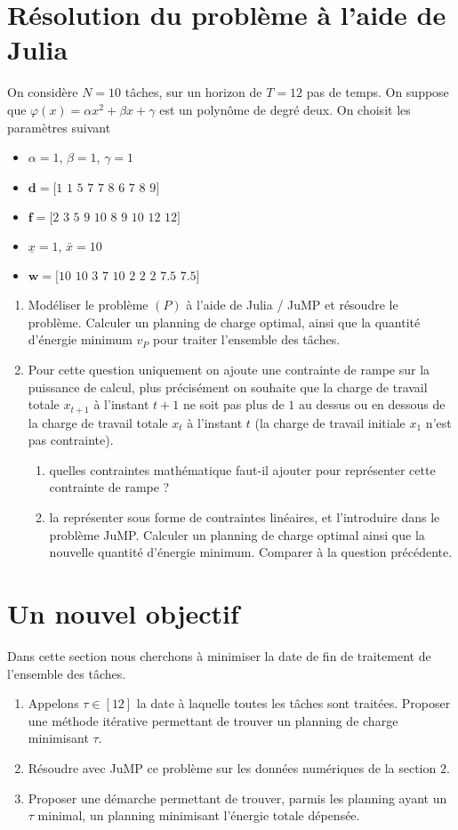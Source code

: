 \documentclass[10pt]{article}
\begin{document}
\section{Résolution du problème à l'aide de Julia}
On considère $N=10$ tâches, sur un horizon de $T=12$ pas de temps. On suppose que $\varphi(x) = \alpha x^2+ \beta x + \gamma $ est un polynôme de degré deux. On choisit les paramètres suivant
\begin{itemize}
	\item $\alpha = 1$, $\beta=1$, $\gamma = 1$
	\item $\mathbf{d}=\textrm{[1 1 5 7 7 8 6 7 8 9]}$
	\item $\mathbf{f}=\textrm{[2 3 5 9 10 8 9 10 12 12]}$
	\item $\underline{x}=1$, $\bar{x} = 10$
	\item $\mathbf{w}=\textrm{[10 10 3 7 10 2 2 2 7.5 7.5]}$
\end{itemize}
\begin{enumerate}[resume]
	\item Modéliser le problème $(P)$ à l'aide de Julia / JuMP et résoudre le problème.
	Calculer un planning de charge optimal, ainsi que la quantité d'énergie minimum $v_P$ pour traiter l'ensemble des tâches.
	\item Pour cette question uniquement on ajoute une contrainte de rampe sur la puissance de calcul, plus précisément on souhaite que la charge de travail totale $x_{t+1}$ à l'instant $t+1$ ne soit pas plus de $1$ au dessus ou en dessous de la charge de travail totale $x_t$ à l'instant $t$ (la charge de travail initiale $x_1$ n'est pas contrainte).
	\begin{enumerate}
		\item quelles contraintes mathématique faut-il ajouter pour représenter cette contrainte de rampe ?
		\item la représenter sous forme de contraintes linéaires, et l'introduire dans le problème JuMP. Calculer un planning de charge optimal ainsi que la nouvelle quantité d'énergie minimum. Comparer à la question précédente.
	\end{enumerate}
\end{enumerate}


\section{Un nouvel objectif}
Dans cette section nous cherchons à minimiser la date de fin de traitement de l'ensemble des tâches.
\begin{enumerate}[resume]
	\item Appelons $\tau \in [12]$ la date à laquelle toutes les tâches sont traitées. Proposer une méthode itérative permettant de trouver un planning de charge minimisant $\tau$.
	\item Résoudre avec JuMP ce problème sur les données numériques de la section $2$.
	\item Proposer une démarche permettant de trouver, parmis les planning ayant un $\tau$ minimal, un planning minimisant l'énergie totale dépensée.
\end{enumerate}
\end{document}
